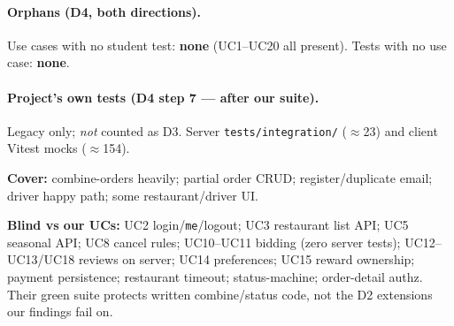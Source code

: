 \paragraph{Orphans (D4, both directions).}
Use cases with no student test: \textbf{none} (UC1--UC20 all present).
Tests with no use case: \textbf{none}.

\paragraph{Project's own tests (D4 step 7 --- after our suite).}
Legacy only; \emph{not} counted as D3.
Server \texttt{tests/integration/} ($\approx$23) and client Vitest mocks ($\approx$154).

\textbf{Cover:} combine-orders heavily; partial order CRUD; register/duplicate email;
driver happy path; some restaurant/driver UI.

\textbf{Blind vs our UCs:} UC2 login/\texttt{me}/logout; UC3 restaurant list API;
UC5 seasonal API; UC8 cancel rules; UC10--UC11 bidding (zero server tests);
UC12--UC13/UC18 reviews on server; UC14 preferences; UC15 reward ownership;
payment persistence; restaurant timeout; status-machine; order-detail authz.
Their green suite protects written combine/status code, not the D2 extensions our findings fail on.

